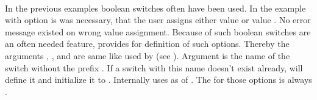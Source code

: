 \begin{Declaration}
                       \\
\end{Declaration}
%
%
In the previous examples boolean switches often have been used. In the example
with option  is was necessary, that the user assigns either
value  or value . No error message existed on wrong
value assignment. Because of such boolean switches are an often needed
feature,  provides  for definition of
such options. Thereby the arguments , ,
and  are same like used by  (see
). Argument 
is the name of the switch without the prefix . If a switch with this
name doesn't exist already,  will define it and
initialize it to . Internally  uses
 as  of . The
 for those options is always .

